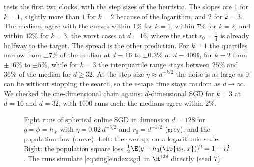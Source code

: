 \begin{refsection}
 tests the first two clocks, with the step sizes of the heuristic. The slopes are $1$ for $k=1$, slightly more than $1$ for $k=2$ because of the logarithm, and $2$ for $k=3$. The medians agree with the curves within $1\%$ for $k=1$, within $7\%$ for $k=2$, and within $12\%$ for $k=3$, the worst cases at $d=16$, where the start $r_0=\frac14$ is already halfway to the target. The spread is the other prediction. For $k=1$ the quartiles narrow from $\pm7\%$ of the median at $d=16$ to $\pm0.3\%$ at $d=4096$, for $k=2$ from $\pm16\%$ to $\pm5\%$, while for $k=3$ the interquartile range stays between $25\%$ and $36\%$ of the median for $d\ge32$. At the step size $\eta\approx d^{-k/2}$ the noise is as large as it can be without stopping the search, so the escape time stays random as $d\to\infty$. We checked the one-dimensional chain against $d$-dimensional SGD for $k=3$ at $d=16$ and $d=32$, with $1000$ runs each: the medians agree within $2\%$.

\begin{figure}[t]
\centering
{}
\caption{Eight runs of spherical online SGD in dimension $d=128$ for $g=\phi=h_3$, with $\eta=0.02\,d^{-3/2}$ and $r_0=d^{-1/2}$ (grey), and the population flow (curve). Left: the overlap, on a logarithmic scale. Right: the population square loss $\frac12\E(y-h_3(\ip{w_t,x}))^2=1-r_t^3$. The runs simulate \eqref{eq:singleindex:sgd} in $\R^{128}$ directly (seed $7$).}\label{fig:singleindex:trajectories}
\end{figure}


\end{refsection}
